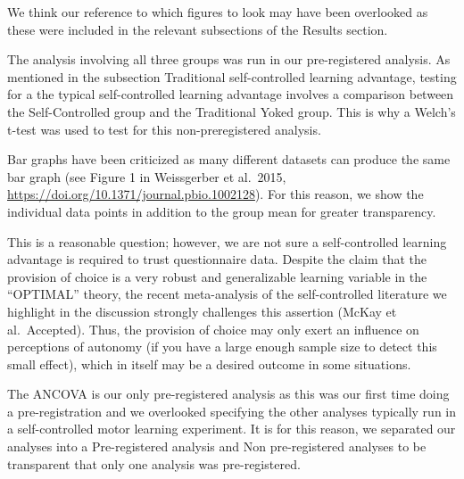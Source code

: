 \documentclass[final]{article}
\begin{document}
We think our reference to which figures to look may have been overlooked as these were included in the relevant subsections of the Results section.


The analysis involving all three groups was run in our pre-registered analysis. As mentioned in the subsection Traditional self-controlled learning advantage, testing for a the typical self-controlled learning advantage involves a comparison between the Self-Controlled group and the Traditional Yoked group. This is why a Welch's t-test was used to test for this non-preregistered analysis.


Bar graphs have been criticized as many different datasets can produce the same bar graph (see Figure 1 in Weissgerber et al.~2015, \url{https://doi.org/10.1371/journal.pbio.1002128}). For this reason, we show the individual data points in addition to the group mean for greater transparency.

This is a reasonable question; however, we are not sure a self-controlled learning advantage is required to trust questionnaire data. Despite the claim that the provision of choice is a very robust and generalizable learning variable in the ``OPTIMAL'' theory, the recent meta-analysis of the self-controlled literature we highlight in the discussion strongly challenges this assertion (McKay et al.~Accepted). Thus, the provision of choice may only exert an influence on perceptions of autonomy (if you have a large enough sample size to detect this small effect), which in itself may be a desired outcome in some situations.


The ANCOVA is our only pre-registered analysis as this was our first time doing a pre-registration and we overlooked specifying the other analyses typically run in a self-controlled motor learning experiment. It is for this reason, we separated our analyses into a Pre-registered analysis and Non pre-registered analyses to be transparent that only one analysis was pre-registered.
\end{document}

